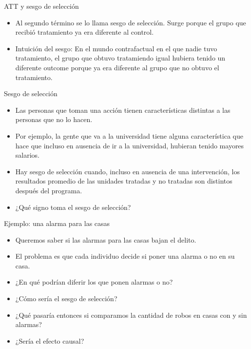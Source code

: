 \documentclass[10pt]{beamer}
\begin{document}
\begin{frame}{ATT y sesgo de selección}
    \begin{itemize}
        \item Al segundo t\'ermino se lo llama sesgo de selecci\'on. Surge porque el grupo que recibi\'o tratamiento ya era diferente al control.
        \item Intuición del sesgo: En el mundo contrafactual en el que nadie tuvo tratamiento, el grupo que obtuvo tratamiendo igual hubiera tenido un diferente outcome porque ya era diferente al grupo que no obtuvo el tratamiento.
    \end{itemize}
\end{frame}

\begin{frame}{Sesgo de selección}
    \begin{itemize}
        \item Las personas que toman una acción tienen características distintas a las personas que no lo hacen.
        \item Por ejemplo, la gente que va a la universidad tiene alguna característica 
 que hace que incluso en ausencia de ir a la universidad, hubieran tenido mayores salarios.
        \item Hay sesgo de selección cuando, incluso en ausencia de una intervención, los resultados promedio de las unidades tratadas y no tratadas son distintos después del programa.
        \item ¿Qué signo toma el sesgo de selección?
    \end{itemize}
\end{frame}

\begin{frame}{Ejemplo: una alarma para las casas}
    \begin{itemize}
        \item Queremos saber si las alarmas para las casas bajan el delito.
        \item El problema es que cada individuo decide si poner una alarma o no en su casa.
        \item ¿En qué podrían diferir los que ponen alarmas o no?
        \item ¿Cómo sería el sesgo de selección?
        \item ¿Qué pasaría entonces si comparamos la cantidad de robos en casas con y sin alarmas?
        \item ¿Ser\'ia el efecto causal?
    \end{itemize}
\end{frame}
\end{document}
